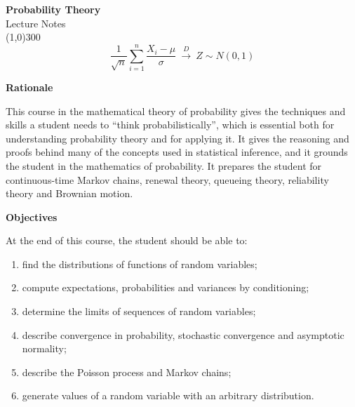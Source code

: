 \documentclass[11pt,a4paper]{article}
\theoremstyle{definition}
\newcommand{\subhead}[1]{%
  \par\medskip\noindent\textbf{#1}\par\nobreak\smallskip}
\begin{document}
\begin{titlepage}
\thispagestyle{empty}
\begin{center}
\vspace*{3cm}
{\Huge\bfseries Probability Theory}\\[1.2cm]
{\large Lecture Notes}\\[2.5cm]
\line(1,0){300}\\[1.5cm]
$$\frac{1}{\sqrt{n}}\sum_{i=1}^{n}\frac{X_i-\mu}{\sigma}\ \xrightarrow{\ D\ }\ Z\sim N(0,1)$$
\end{center}
\end{titlepage}

\tableofcontents
\thispagestyle{empty}
\clearpage
\setcounter{page}{1}



\subhead{Rationale}
This course in the mathematical theory of probability gives the techniques and skills a student needs to
``think probabilistically'', which is essential both for understanding probability theory and for applying it.
It gives the reasoning and proofs behind many of the concepts used in statistical inference, and it grounds the
student in the mathematics of probability. It prepares the student for continuous-time Markov chains, renewal
theory, queueing theory, reliability theory and Brownian motion.

\subhead{Objectives}
At the end of this course, the student should be able to:
\begin{enumerate}
\item find the distributions of functions of random variables;
\item compute expectations, probabilities and variances by conditioning;
\item determine the limits of sequences of random variables;
\item describe convergence in probability, stochastic convergence and asymptotic normality;
\item describe the Poisson process and Markov chains;
\item generate values of a random variable with an arbitrary distribution.
\end{enumerate}
\end{document}
